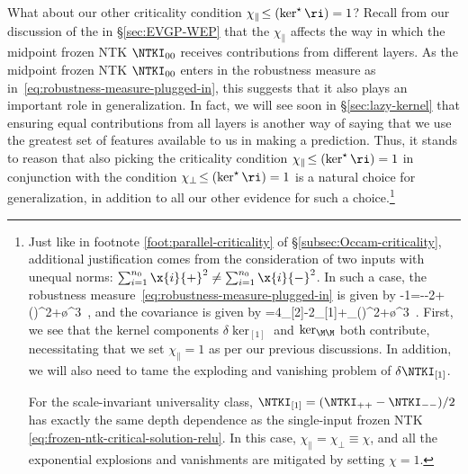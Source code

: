 What about our other criticality condition $\chi_\parallel\!\le(\ker^\star\ri) =1$? Recall from our discussion of the  in \S\ref{sec:EVGP-WEP} that the  $\chi_\parallel$ affects the way in which the midpoint frozen NTK $\NTKI_{00}$
receives contributions from different layers. %
As the midpoint frozen NTK $\NTKI_{00}$ enters in the robustness measure as in~\eqref{eq:robustness-measure-plugged-in}, this suggests that it also plays an important role in generalization. In fact, we will see soon in \S\ref{sec:lazy-kernel} that ensuring equal contributions from all layers is another way of saying that we use the greatest set of features available to us in making a prediction. Thus, it stands to reason that also picking the criticality condition $\chi_\parallel\!\le(\ker^\star\ri) =1$ in conjunction with the condition $\chi_\perp\!\le(\ker^\star\ri) =1$ is a natural choice for generalization, in addition to all our other evidence for such a choice.\footnote{Just like in footnote \ref{foot:parallel-criticality} of \S\ref{subsec:Occam-criticality}, additional justification comes from the consideration of  two inputs with unequal norms: $\sum_{i=1}^{n_0} \x{i}{+}^2\ne\sum_{i=1}^{n_0} \x{i}{-}^2$.
In such a case,  the robustness measure~\eqref{eq:robustness-measure-plugged-in} is given by
\be\label{eq:robustness-with-parallel}
\frac{\NTKI_{-+}}{\NTKI_{++}}-1=-\frac{\delta\NTKI_{[1]}}{\NTKI_{\M\M}}-2\frac{\delta\delta\NTKI_{[2]}}{\NTKI_{\M\M}}+\le(\frac{\delta \NTKI_{[1]}}{\NTKI_{\M\M}}\ri)^2+\o{\delta^3}\, ,
\ee
and the covariance is given by
\be
{}=4\delta\delta\ker_{[2]}-2\delta\ker_{[1]}\frac{\delta \NTKI_{[1]}}{\NTKI_{\M\M}}+\ker_{\M\M}\le(\frac{\delta \NTKI_{[1]}}{\NTKI_{\M\M}}\ri)^2+\o{\delta^3}\, .
\ee
First, we see that the kernel components $\delta\ker_{[1]}$ and $\ker_{\M\M}$ both contribute, necessitating that we set $\chi_{\parallel}=1$ as per our previous discussions. In addition, we will also need to tame the exploding and vanishing problem of $\delta \NTKI_{[1]}$.

For the scale-invariant universality class, $\NTKI_{[1]}=(\NTKI_{++}-\NTKI_{--})/2$ has exactly the same depth dependence as the single-input frozen NTK \eqref{eq:frozen-ntk-critical-solution-relu}. In this case, $\chi_{\parallel}=\chi_{\perp}\equiv \chi$, and all the exponential explosions and vanishments are mitigated by setting $\chi=1$.

}

